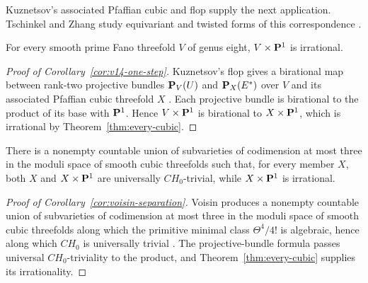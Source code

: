 Kuznetsov's associated Pfaffian cubic and flop supply the next application.
Tschinkel and Zhang study equivariant and twisted forms of this correspondence
\cite{TschinkelZhangV14}.

\begin{corollary}
\label{cor:v14-one-step}
%
%
For every smooth prime Fano threefold \(V\) of genus eight,
\(V\times\mathbf P^1\) is irrational.
\end{corollary}

\begin{proof}[Proof of Corollary~\ref{cor:v14-one-step}]
Kuznetsov's flop gives a birational map between rank-two projective bundles
\(\mathbf P_V(U)\) and \(\mathbf P_X(E^*)\) over \(V\) and its associated Pfaffian cubic
threefold \(X\) \cite[Theorems~2.17--2.18]{KuznetsovV14}.  Each projective
bundle is birational to the product of its base with \(\mathbf P^1\).  Hence
\(V\times\mathbf P^1\) is birational to \(X\times\mathbf P^1\), which is irrational by
Theorem~\ref{thm:every-cubic}.
%
%
%
\end{proof}

\begin{corollary}
\label{cor:voisin-separation}
%
%
%
%
There is a nonempty countable union of subvarieties of codimension at most
three in the moduli space of smooth cubic threefolds such that, for every
member \(X\), both \(X\) and \(X\times\mathbf P^1\) are universally
\(CH_0\)-trivial, while \(X\times\mathbf P^1\) is irrational.
\end{corollary}

\begin{proof}[Proof of Corollary~\ref{cor:voisin-separation}]
Voisin produces a nonempty countable union of subvarieties of codimension at
most three in the moduli space of smooth cubic threefolds along which the
primitive minimal class \(\Theta^4/4!\) is algebraic, hence along which
\(CH_0\) is universally trivial \cite[Theorem~4.5 and
Lemma~4.6]{Voisin}.  The projective-bundle formula passes universal
\(CH_0\)-triviality to the product, and
Theorem~\ref{thm:every-cubic} supplies its irrationality.
%
%
%
\end{proof}

